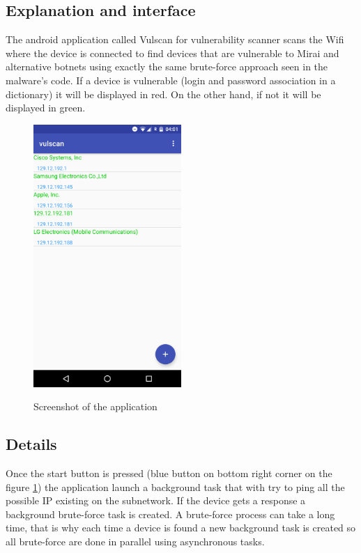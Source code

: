\documentclass{report}
\begin{document}
\subsection{Explanation and interface}
The android application called Vulscan for vulnerability scanner scans the Wifi where the device is connected to find devices that are vulnerable to Mirai and alternative botnets using exactly the same brute-force approach seen in the malware's code. If a device is vulnerable (login and password association in a dictionary) it will be displayed in red. On the other hand, if not it will be displayed in green.
\begin{figure}[h]
 \caption{Screenshot of the application}
 \centering
 \includegraphics[width=0.5\textwidth]{./img/screen-act}
 \label{fig:screen-act}
\end{figure}

\subsection{Details}
Once the start button is pressed (blue button on bottom right corner on the figure \ref{fig:screen-act}) the application launch a background task that with try to ping all the possible IP existing on the subnetwork. If the device gets a response a background brute-force task is created. A brute-force process can take a long time, that is why each time a device is found a new background task is created so all brute-force are done in parallel using asynchronous tasks.
\end{document}

